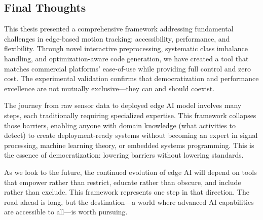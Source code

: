 \subsection{Final Thoughts}

This thesis presented a comprehensive framework addressing fundamental challenges in edge-based motion tracking: accessibility, performance, and flexibility. Through novel interactive preprocessing, systematic class imbalance handling, and optimization-aware code generation, we have created a tool that matches commercial platforms' ease-of-use while providing full control and zero cost. The experimental validation confirms that democratization and performance excellence are not mutually exclusive—they can and should coexist.

The journey from raw sensor data to deployed edge AI model involves many steps, each traditionally requiring specialized expertise. This framework collapses those barriers, enabling anyone with domain knowledge (what activities to detect) to create deployment-ready systems without becoming an expert in signal processing, machine learning theory, or embedded systems programming. This is the essence of democratization: lowering barriers without lowering standards.

As we look to the future, the continued evolution of edge AI will depend on tools that empower rather than restrict, educate rather than obscure, and include rather than exclude. This framework represents one step in that direction. The road ahead is long, but the destination—a world where advanced AI capabilities are accessible to all—is worth pursuing.